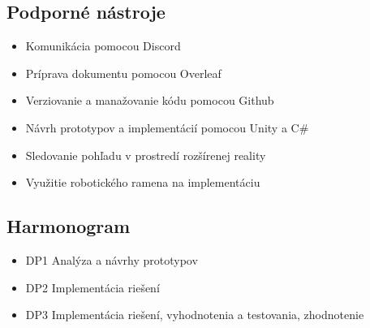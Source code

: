 \documentclass[11pt,english,a4paper]{article}
\begin{document}
        \subsection{Podporné  nástroje}\label{sec:tools}
        \begin{itemize}
                \item  Komunikácia  pomocou  Discord
                \item  Príprava  dokumentu  pomocou  Overleaf
                \item  Verziovanie  a  manažovanie  kódu  pomocou  Github
                \item  Návrh  prototypov  a  implementácií  pomocou  Unity  a  C\#
                \item  Sledovanie  pohľadu  v  prostredí  rozšírenej  reality
                \item  Využitie  robotického  ramena  na  implementáciu
        \end{itemize}


        \subsection{Harmonogram}\label{sec:timeline}
        \begin{itemize}
                \item  DP1  Analýza  a  návrhy  prototypov
                \item  DP2  Implementácia  riešení
                \item  DP3  Implementácia  riešení,  vyhodnotenia  a  testovania,  zhodnotenie
        \end{itemize}
\end{document}
